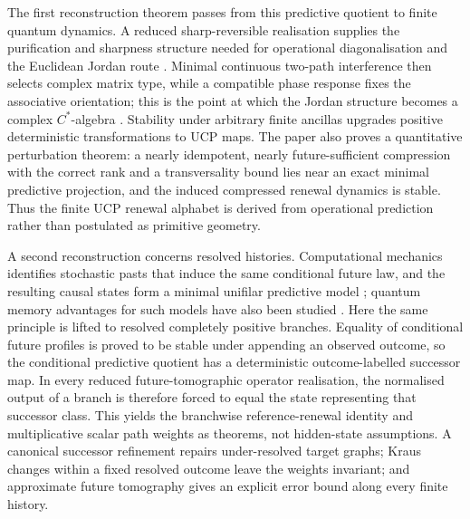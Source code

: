 \documentclass[11pt]{article}
\theoremstyle{definition}
\theoremstyle{remark}
\begin{document}
The first reconstruction theorem passes from this predictive quotient to
finite quantum dynamics.  A reduced sharp-reversible realisation supplies the
purification and sharpness structure needed for operational diagonalisation
and the Euclidean Jordan route
\cite{ChiribellaScandolo2015,BarnumLeeScandoloSelby2017,BarnumUdudecVdW2023}.
Minimal continuous two-path interference then selects complex matrix type,
while a compatible phase response fixes the associative orientation; this is
the point at which the Jordan structure becomes a complex $C^*$-algebra
\cite{HancheOlsen1985}.  Stability under arbitrary finite ancillas upgrades
positive deterministic transformations to UCP maps.  The paper also proves a
quantitative perturbation theorem: a nearly idempotent, nearly
future-sufficient compression with the correct rank and a transversality bound
lies near an exact minimal predictive projection, and the induced compressed
renewal dynamics is stable.  Thus the finite UCP renewal alphabet is derived
from operational prediction rather than postulated as primitive geometry.

A second reconstruction concerns resolved histories.  Computational mechanics
identifies stochastic pasts that induce the same conditional future law, and
the resulting causal states form a minimal unifilar predictive model
\cite{CrutchfieldYoung1989,ShaliziCrutchfield2001}; quantum memory advantages
for such models have also been studied
\cite{GuWiesnerRieperVedral2012,BinderThompsonGu2018}.  Here the same principle
is lifted to resolved completely positive branches.  Equality of conditional
future profiles is proved to be stable under appending an observed outcome,
so the conditional predictive quotient has a deterministic outcome-labelled
successor map.  In every reduced future-tomographic operator realisation, the
normalised output of a branch is therefore forced to equal the state
representing that successor class.  This yields the branchwise
reference-renewal identity and multiplicative scalar path weights as theorems,
not hidden-state assumptions.  A canonical successor refinement repairs
under-resolved target graphs; Kraus changes within a fixed resolved outcome
leave the weights invariant; and approximate future tomography gives an
explicit error bound along every finite history.
\end{document}
